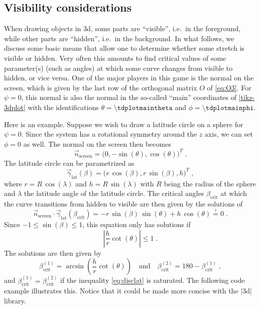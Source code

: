 \documentclass[a4paper,fleqn]{ltxdoc}
\begin{document}
\subsection{Visibility considerations}

When drawing objects in 3d, some parts are ``visible'', i.e.\ in the foreground,
while other parts are ``hidden'', i.e.\ in the background. In what follows, we
discuss some basic means that allow one to determine whether some stretch is
visible or hidden. Very often this amounts to find critical values of some
parameter(s) (such as angles) at which some curve changes from visible to
hidden, or vice versa. One of the major players in this game is the normal on
the screen, which is given by the last row of the orthogonal matrix $O$ of
\eqref{eq:O3}. For $\psi=0$, this normal is also the normal in the so-called
``main'' coordinates of 
\href{https://ctan.org/pkg/tikz-3dplot?lang=en}{|tikz-3dplot|} with the
identifications $\theta=\texttt{\textbackslash tdplotmaintheta}$ and
$\phi=\texttt{\textbackslash tdplotmainphi}$.

Here is an example. Suppose we wish to draw a latitude circle on a sphere for
$\psi=0$. Since the system has a rotational symmetry around the $z$ axis, we can
set $\phi=0$ as well. The normal on the screen then becomes
\[
 \vec n_\mathrm{screen}=
 \bigl(0,-\sin(\theta),\cos(\theta)\bigr)^T\;.
\]
The latitude circle can be parametrized as
\[
 \vec\gamma_\mathrm{lat}(\beta)=
 \bigl(r\,\cos(\beta),r\,\sin(\beta),h\bigr)^T\;,
\]
where $r=R\,\cos(\lambda)$ and $h=R\,\sin(\lambda)$ with $R$ being the radius of
the sphere and $\lambda$ the latitude angle of the latitude circle. The critical
angles $\beta_\mathrm{crit}$ at which the curve transitions from hidden to
visible are then given by the solutions of
\[
 \vec n_\mathrm{screen}\cdot\vec\gamma_\mathrm{lat}(\beta_\mathrm{crit})
 =-r\,\sin(\beta)\,\sin(\theta)+h\,\cos(\theta)
 \overset{!}{=}0\;.
\]
Since $-1\le\sin(\beta)\le1$, this equation only has solutions if 
\begin{equation}\label{eq:disclat}
 \left\vert\frac{h}{r}\cot(\theta)\right\vert\le1\;.
\end{equation} 
The solutions are then given by 
\[
 \beta_\mathrm{crit}^{(1)}=\arcsin\left(\frac{h}{r}\cot(\theta)\right)
 \quad\text{and}\quad
 \beta_\mathrm{crit}^{(2)}=180-\beta_\mathrm{crit}^{(1)}\;,
\]
and $\beta_\mathrm{crit}^{(1)}=\beta_\mathrm{crit}^{(2)}$ if the inequality 
\eqref{eq:disclat} is saturated. The following code example illustrates this.
Notice that it could be made more concise with the |3d| library.
\end{document}

